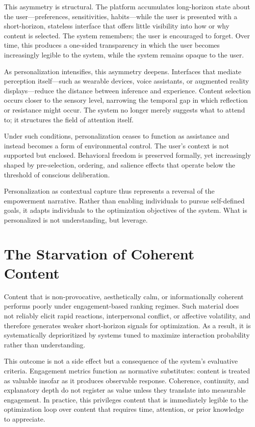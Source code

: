 \documentclass[12pt]{article}
\begin{document}
This asymmetry is structural. The platform accumulates long-horizon state about the user—preferences, sensitivities, habits—while the user is presented with a short-horizon, stateless interface that offers little visibility into how or why content is selected. The system remembers; the user is encouraged to forget. Over time, this produces a one-sided transparency in which the user becomes increasingly legible to the system, while the system remains opaque to the user.

As personalization intensifies, this asymmetry deepens. Interfaces that mediate perception itself—such as wearable devices, voice assistants, or augmented reality displays—reduce the distance between inference and experience. Content selection occurs closer to the sensory level, narrowing the temporal gap in which reflection or resistance might occur. The system no longer merely suggests what to attend to; it structures the field of attention itself.

Under such conditions, personalization ceases to function as assistance and instead becomes a form of environmental control. The user’s context is not supported but enclosed. Behavioral freedom is preserved formally, yet increasingly shaped by pre-selection, ordering, and salience effects that operate below the threshold of conscious deliberation.

Personalization as contextual capture thus represents a reversal of the empowerment narrative. Rather than enabling individuals to pursue self-defined goals, it adapts individuals to the optimization objectives of the system. What is personalized is not understanding, but leverage.

\section{The Starvation of Coherent Content}

Content that is non-provocative, aesthetically calm, or informationally coherent performs poorly under engagement-based ranking regimes. Such material does not reliably elicit rapid reactions, interpersonal conflict, or affective volatility, and therefore generates weaker short-horizon signals for optimization. As a result, it is systematically deprioritized by systems tuned to maximize interaction probability rather than understanding.

This outcome is not a side effect but a consequence of the system’s evaluative criteria. Engagement metrics function as normative substitutes: content is treated as valuable insofar as it produces observable response. Coherence, continuity, and explanatory depth do not register as value unless they translate into measurable engagement. In practice, this privileges content that is immediately legible to the optimization loop over content that requires time, attention, or prior knowledge to appreciate.
\end{document}
